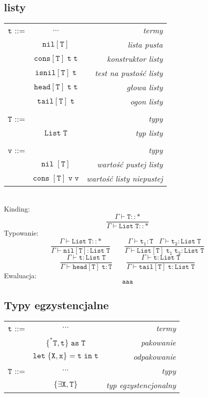 \documentclass[11pt,leqno]{article}
\begin{document}
\subsection{listy}

\begin{tabular}{| l c r |}
  \hline
  $\mathtt{t}$ ::= & $\dots$ & \textit{termy}  \\
   & $\mathtt{nil[T]}$ & \textit{lista pusta}  \\
   & $\mathtt{cons[T]\;t\;t}$ & \textit{konstruktor listy} \\
   & $\mathtt{isnil[T]\;t}$ & \textit{test na pustość listy} \\
   & $\mathtt{head[T]\;t\;t}$ & \textit{głowa listy} \\
   & $\mathtt{tail[T]\;t}$ & \textit{ogon listy} \\
   & & \\
  $\mathtt{T}$ ::= &  & \textit{typy} \\
   & $\mathtt{List\;T}$ & \textit{typ listy} \\
   & & \\
  $\mathtt{v}$ ::= &  & \textit{typy} \\
   & $\mathtt{nil\;[T]}$ & \textit{wartość pustej listy} \\
   & $\mathtt{cons\;[T]\;v\;v}$ & \textit{wartość listy niepustej} \\
  \hline
\end{tabular} \\
Kinding:
 	\[\mathtt{ \frac{\Gamma \vdash T::\ast}{\Gamma \vdash List\;T::\ast}
		}
	\]
Typowanie:
 	\[\mathtt{ \frac{\Gamma \vdash List\;T :: \ast}{\Gamma \vdash nil[T] : List\;T } \qquad \frac{\Gamma \vdash t_1:T \;\;\;\Gamma \vdash t_2:List\;T}{\Gamma \vdash List[T]\;t_1\;t_2:List\;T}
		}
	\]
 	\[\mathtt{ \frac{\Gamma \vdash t:List\;T }{\Gamma \vdash head[T]\;t : T } \qquad \frac{\Gamma \vdash t:List\;T }{\Gamma \vdash tail[T]\;t : List\;T }
		}
	\]
Ewaluacja:
 	\[\mathtt{ aaa
		}
	\]
\subsection{Typy egzystencjalne}


\begin{tabular}{| l c r |}
  \hline
  $\mathtt{t}$ ::= & $\cdots$ & \textit{termy}  \\
   & $\mathtt{\{^*T,t\}\;as\;T}$ & \textit{pakowanie} \\
   & $\mathtt{let\;\{X,x\}=t\;in\;t}$ & \textit{odpakowanie} \\
  $\mathtt{T}$ ::= & $\cdots$ & \textit{typy}  \\
   & $\mathtt{\{\exists X,T\}}$ & \textit{typ egzystencjonalny} \\
  \hline
\end{tabular} \\
\end{document}
